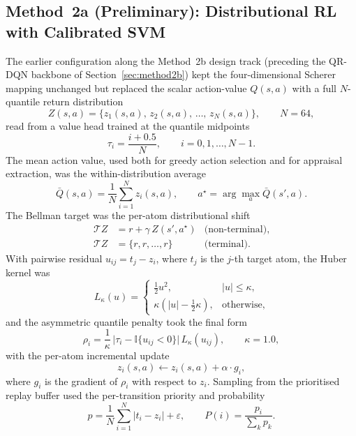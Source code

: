 \documentclass[conference]{IEEEtran}
\begin{document}
\subsection{Method~2a (Preliminary): Distributional RL with Calibrated SVM}
\label{sec:method2a}
The earlier configuration along the Method~2b design track (preceding
the QR-DQN backbone of Section~\ref{sec:method2b}) kept the
four-dimensional Scherer mapping unchanged but replaced the scalar
action-value $Q(s, a)$ with a full $N$-quantile return distribution
\begin{equation}
Z(s, a) = \big\{z_{1}(s, a),\, z_{2}(s, a),\, \dots,\, z_{N}(s, a)\big\},
\qquad N = 64,
\label{eq:m2a_z}
\end{equation}
read from a value head trained at the quantile midpoints
\begin{equation}
\tau_{i} = \frac{i + 0.5}{N},
\qquad i = 0, 1, \dots, N - 1.
\label{eq:m2a_tau}
\end{equation}
The mean action value, used both for greedy action selection and for
appraisal extraction, was the within-distribution average
\begin{equation}
\bar Q(s, a) = \frac{1}{N}\sum_{i=1}^{N} z_{i}(s, a),
\qquad
a^{\star} = \arg\max_{a} \bar Q(s', a).
\label{eq:m2a_qbar}
\end{equation}
The Bellman target was the per-atom distributional shift
\begin{align}
\mathcal{T}Z &= r + \gamma\, Z(s', a^{\star})
   & \text{(non-terminal)}, \label{eq:m2a_bellman_nt}\\
\mathcal{T}Z &= \{r, r, \dots, r\}
   & \text{(terminal)}. \label{eq:m2a_bellman_t}
\end{align}
With pairwise residual $u_{ij} = t_{j} - z_{i}$, where $t_{j}$ is the
$j$-th target atom, the Huber kernel was
\begin{equation}
L_{\kappa}(u) =
\begin{cases}
\tfrac{1}{2} u^{2}, & |u| \le \kappa, \\[2pt]
\kappa\!\left(|u| - \tfrac{1}{2}\kappa\right), & \text{otherwise},
\end{cases}
\label{eq:m2a_huber}
\end{equation}
and the asymmetric quantile penalty took the final form
\begin{equation}
\rho_{i} = \frac{1}{\kappa}\,
\big|\tau_{i} - \mathbb{I}\{u_{ij} < 0\}\big|\,
L_{\kappa}(u_{ij}),
\qquad \kappa = 1.0,
\label{eq:m2a_rho}
\end{equation}
with the per-atom incremental update
\begin{equation}
z_{i}(s, a) \leftarrow z_{i}(s, a) + \alpha \cdot g_{i},
\label{eq:m2a_update}
\end{equation}
where $g_{i}$ is the gradient of $\rho_{i}$ with respect to $z_{i}$.
Sampling from the prioritised replay buffer used the per-transition
priority and probability
\begin{equation}
p = \frac{1}{N}\sum_{i=1}^{N} |t_{i} - z_{i}| + \varepsilon,
\qquad
P(i) = \frac{p_{i}}{\sum_{k} p_{k}}.
\label{eq:m2a_per}
\end{equation}
\end{document}

